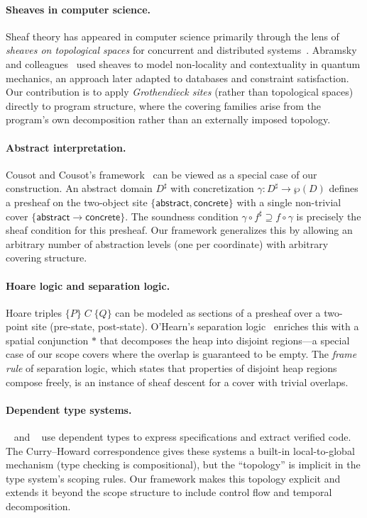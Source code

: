 \documentclass[11pt]{article}
\begin{document}
\paragraph{Sheaves in computer science.}
Sheaf theory has appeared in computer science primarily through the lens of
\emph{sheaves on topological spaces} for concurrent and distributed
systems~\cite{Goguen1992}.  Abramsky and
colleagues~\cite{AbramskyBrandenburger2011} used sheaves to model
non-locality and contextuality in quantum mechanics, an approach later
adapted to databases and constraint satisfaction.  Our contribution is to
apply \emph{Grothendieck sites} (rather than topological spaces) directly
to program structure, where the covering families arise from the program's
own decomposition rather than an externally imposed topology.

\paragraph{Abstract interpretation.}
Cousot and Cousot's framework~\cite{CousotCousot1977} can be viewed as a
special case of our construction.  An abstract domain $D^\sharp$ with
concretization $\gamma \colon D^\sharp \to \wp(D)$ defines a presheaf on
the two-object site $\{\mathsf{abstract}, \mathsf{concrete}\}$ with a single
non-trivial cover $\{\mathsf{abstract} \to \mathsf{concrete}\}$.  The
soundness condition $\gamma \circ f^\sharp \supseteq f \circ \gamma$ is
precisely the sheaf condition for this presheaf.  Our framework generalizes
this by allowing an arbitrary number of abstraction levels (one per
coordinate) with arbitrary covering structure.

\paragraph{Hoare logic and separation logic.}
Hoare triples $\{P\}\; C \;\{Q\}$ can be modeled as sections of a presheaf
over a two-point site (pre-state, post-state).  O'Hearn's separation
logic~\cite{OHearn2019} enriches this with a spatial conjunction
$*$ that decomposes the heap into disjoint regions---a special case of our
scope covers where the overlap is guaranteed to be empty.  The \emph{frame
rule} of separation logic, which states that properties of disjoint heap
regions compose freely, is an instance of sheaf descent for a cover with
trivial overlaps.

\paragraph{Dependent type systems.}
\LEAN~\cite{deMoura2021} and \Fstar~\cite{Swamy2016} use dependent types
to express specifications and extract verified code.  The Curry--Howard
correspondence gives these systems a built-in local-to-global mechanism
(type checking is compositional), but the ``topology'' is implicit in the
type system's scoping rules.  Our framework makes this topology explicit
and extends it beyond the scope structure to include control flow and
temporal decomposition.
\end{document}
